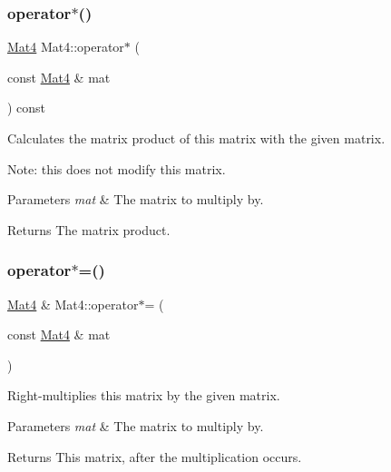\subsubsection{\texorpdfstring{operator$\ast$()}{operator*()}\hspace{0.1cm}{\footnotesize\ttfamily [2/2]}}
{\footnotesize\ttfamily \hyperlink{classMat4}{Mat4} Mat4\+::operator$\ast$ (\begin{DoxyParamCaption}\item[{const \hyperlink{classMat4}{Mat4} \&}]{mat }\end{DoxyParamCaption}) const\hspace{0.3cm}{\ttfamily [inline]}}

Calculates the matrix product of this matrix with the given matrix.

Note\+: this does not modify this matrix.


\begin{DoxyParams}{Parameters}
{\em mat} & The matrix to multiply by. \\
\hline
\end{DoxyParams}
\begin{DoxyReturn}{Returns}
The matrix product. 
\end{DoxyReturn}
\mbox{\label{classMat4_aff7f316cabd6773d02b1704fe1b629b2}} 
\subsubsection{\texorpdfstring{operator$\ast$=()}{operator*=()}\hspace{0.1cm}{\footnotesize\ttfamily [1/2]}}
{\footnotesize\ttfamily \hyperlink{classMat4}{Mat4} \& Mat4\+::operator$\ast$= (\begin{DoxyParamCaption}\item[{const \hyperlink{classMat4}{Mat4} \&}]{mat }\end{DoxyParamCaption})\hspace{0.3cm}{\ttfamily [inline]}}

Right-\/multiplies this matrix by the given matrix.


\begin{DoxyParams}{Parameters}
{\em mat} & The matrix to multiply by. \\
\hline
\end{DoxyParams}
\begin{DoxyReturn}{Returns}
This matrix, after the multiplication occurs. 
\end{DoxyReturn}
\mbox{\label{classMat4_ab51d6459570c1632d92aa34d893be343}} 
